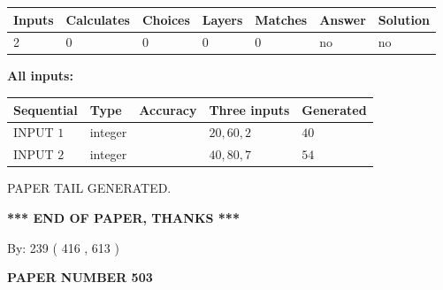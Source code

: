\documentclass[12pt]{article}
\begin{document}
   
   
   
\noindent\begin{tabular}{|l|l|l|l|l|l|l|}
 \hline
Inputs & Calculates & Choices & Layers & Matches & Answer & Solution \\ \hline
 2  & 
 0  & 
 0
  & 
 0  & 
 0  & 
  no & 
  no 
  \\ \hline
 \end{tabular}
   
   
   
   
\noindent{}
   
   
   
   
\noindent\vspace{0.1in}\hspace{-0.08in} {\textbf{\Large{All inputs: }}}
   
   
  
  
\noindent\begin{tabular}{|l|l|l|l|l|}
\hline
 Sequential & Type & Accuracy & Three inputs & Generated \\ 
\hline
 
 
  INPUT $  1 $ & integer &  & $
 20
 , 
 60
 , 
 2
 $ & $ 40 $ 
 \\  \hline  
 
 
  INPUT $  2 $ & integer &  & $
 40
 , 
 80
 , 
 7
 $ & $ 54 $ 
 \\  \hline  
 \end{tabular}
   
   
   
   
   
   
 \vspace{0.2in}
 
   
   
\vspace{2.0in} PAPER TAIL GENERATED.
   
   
   
   
\vspace{1.0in} 
{\textbf{\large{ *** END OF PAPER, THANKS *** }}} 
   
   
\hspace{1.0in} By: 
 239 ( 416 ,  613 )
   
   
   
   
\newpage 
\setcounter{page}{ 
   503001 } 
   
   
   
   
 {\textbf{ \Large{ PAPER NUMBER  503  }}}
   
\end{document}
